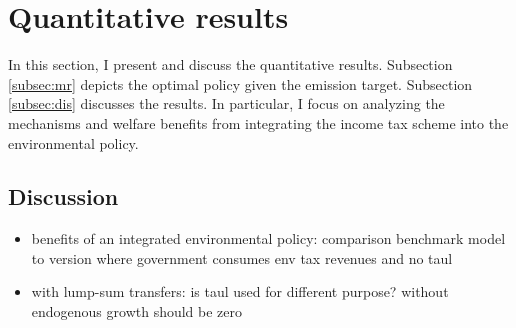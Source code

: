 \section{Quantitative results}\label{sec:res}

In this section, I present and discuss the quantitative results.
Subsection \ref{subsec:mr} depicts the optimal policy given the emission target. Subsection \ref{subsec:dis} discusses the results. In particular, I focus on analyzing the mechanisms and welfare benefits from integrating the income tax scheme into the environmental policy. 

\subsection{Discussion}
\begin{itemize}
	\item benefits of an integrated environmental policy: comparison benchmark model to version where government consumes env tax revenues and no taul
	\item with lump-sum transfers: is taul used for different purpose? without endogenous growth should be zero
\end{itemize}